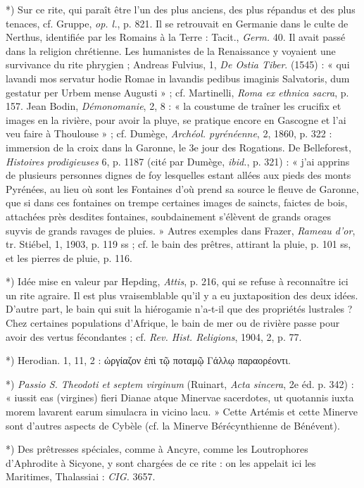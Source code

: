 \documentclass[a4paper, 11pt, oneside, polutonikogreek, french]{article}
\begin{document}
*) Sur ce rite, qui paraît être l'un des plus anciens, des plus répandus et des plus tenaces, cf. Gruppe, \emph{op. l.}, p. 821. Il se retrouvait en Germanie dans le culte de Nerthus, identifiée par les Romains à la Terre : Tacit., \emph{Germ.} 40. Il avait passé dans la religion chrétienne. Les humanistes de la Renaissance y voyaient une survivance du rite phrygien ; Andreas Fulvius, 1, \emph{De Ostia Tiber}. (1545) : « qui lavandi mos servatur hodie Romae in lavandis pedibus imaginis Salvatoris, dum gestatur per Urbem mense Augusti » ; cf. Martinelli, \emph{Roma ex ethnica sacra}, p. 157. Jean Bodin, \emph{Démonomanie}, 2, 8 : « la coustume de traîner les crucifix et images en la rivière, pour avoir la pluye, se pratique encore en Gascogne et l'ai veu faire à Thoulouse » ; cf. Dumège, \emph{Archéol. pyrénéenne}, 2, 1860, p. 322 : immersion de la croix dans la Garonne, le 3e jour des Rogations. De Belleforest, \emph{Histoires prodigieuses} 6, p. 1187 (cité par Dumège, \emph{ibid.}, p. 321) : « j'ai apprins de plusieurs personnes dignes de foy lesquelles estant allées aux pieds des monts Pyrénées, au lieu où sont les Fontaines d'où prend sa source le fleuve de Garonne, que si dans ces fontaines on trempe certaines images de saincts, faictes de bois, attachées près desdites fontaines, soubdainement s'élèvent de grands orages suyvis de grands ravages de pluies. » Autres exemples dans Frazer, \emph{Rameau d'or}, tr. Stiébel, 1, 1903, p. 119 ss ; cf. le bain des prêtres, attirant la pluie, p. 101 ss, et les pierres de pluie, p. 116.

*) Idée mise en valeur par Hepding, \emph{Attis}, p. 216, qui se refuse à reconnaître ici un rite agraire. Il est plus vraisemblable qu'il y a eu juxtaposition des deux idées. D'autre part, le bain qui suit la hiérogamie n'a-t-il que des propriétés lustrales ? Chez certaines populations d'Afrique, le bain de mer ou de rivière passe pour avoir des vertus fécondantes ; cf. \emph{Rev. Hist. Religions}, 1904, 2, p. 77.

*) Herodian. 1, 11, 2 : ὠργίαζον ἐπὶ τῷ ποταμῷ Γάλλῳ παραορέοντι.

*) \emph{Passio S. Theodoti et septem virginum} (Ruinart, \emph{Acta sincera}, 2e éd. p. 342) : « iussit eas (virgines) fieri Dianae atque Minervae sacerdotes, ut quotannis iuxta morem lavarent earum simulacra in vicino lacu. » Cette Artémis et cette Minerve sont d'autres aspects de Cybèle (cf. la Minerve Bérécynthienne de Bénévent).

*) Des prêtresses spéciales, comme à Ancyre, comme les Loutrophores d'Aphrodite à Sicyone, y sont chargées de ce rite : on les appelait ici les Maritimes, Thalassiai : \emph{CIG.} 3657.
\end{document}
